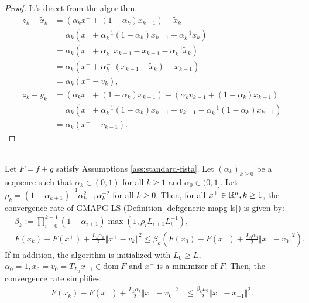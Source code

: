 \documentclass[12pt]{report}
\begin{document}
        \begin{proof}
            It's direct from the algorithm. 
            \begin{align*}
                z_k - \tilde x_k &= (\alpha_k x^+ + (1 - \alpha_k)x_{k - 1}) - \tilde x_k
                \\
                &= \alpha_k (x^+ + \alpha_k^{-1}(1 - \alpha_k)x_{k - 1} - \alpha_k^{-1}\tilde x_k)
                \\
                &= \alpha_k(x^+ + \alpha_k^{-1}x_{k - 1} - x_{k - 1} - \alpha_k^{-1}\tilde x_k)
                \\
                &= \alpha_k(x^+ + \alpha_k^{-1}(x_{k - 1} - \tilde x_k) - x_{k - 1})
                \\
                &= \alpha_k(x^+ - v_{k}), 
                \\
                z_k - y_k &= 
                (\alpha_k x^+ + (1 - \alpha_k)x_{k - 1}) - \left(
                    \alpha_k v_{k - 1} + (1 - \alpha_k)x_{k - 1}
                \right)
                \\
                &= \alpha_k(x^+ + \alpha_k^{-1}(1 - \alpha_k)x_{k - 1} - v_{k - 1} - \alpha_k^{-1}(1 - \alpha_k)x_{k - 1})
                \\
                &= \alpha_k(x^+ - v_{k - 1}). 
            \end{align*}
        \end{proof}
        \begin{theorem}\; \label{thm:gmapg-ls-convergence}\;\\
            Let $F = f + g$ satisfy Assumptions \ref{ass:standard-fista}. 
            Let $(\alpha_k)_{k \ge 0}$ be a sequence such that $\alpha_k \in (0, 1)$ for all $k \ge 1$ and $\alpha_0 \in (0, 1]$. 
            Let $\rho_k = (1 - \alpha_{k + 1})^{-1}\alpha_{k + 1}^2 \alpha_k^{-2}$ for all $k \ge 0$. 
            Then, for all $x^+ \in \mathbb R^n, k \ge 1$, the convergence rate of GMAPG-LS (Definition \ref{def:generic-mapg-ls}) is given by: 
            \begin{align*}
                & \beta_k := \prod_{i = 0}^{k - 1} (1 - \alpha_{i + 1})
                \max\left(1, \rho_i L_{i + 1}L_i^{-1}\right), 
                \\
                & F(x_k) - F(x^+) + \frac{L_k\alpha_k}{2}\Vert x^+ - v_k\Vert^2
                \le 
                \beta_k
                \left(
                    F(x_0) - F(x^+) + \frac{L_0\alpha_0}{2} \Vert x^+ - v_0\Vert^2
                \right). 
            \end{align*}
            If in addition, the algorithm is initialized with $L_0 \ge L$, $\alpha_0 = 1, x_0 = v_0 = T_{L_{0}}x_{-1} \in \text{dom}\; F$ and $x^+$ is a minimizer of $F$.
            Then, the convergence rate simplifies: 
            \begin{align*}
                F(x_k) - F(x^+) + \frac{L_k\alpha_k}{2}\Vert x^+ - v_k\Vert^2
                & \le 
                \frac{\beta_kL_0}{2}\Vert x^+ - x_{-1}\Vert^2. 
            \end{align*}
        \end{theorem}
\end{document}
